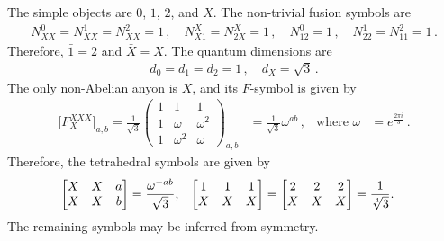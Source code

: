 The simple objects are $0$, $1$, $2$, and $X$.
The non-trivial fusion symbols are
\begin{align}
	N^0_{XX} = N^1_{XX} = N^2_{XX} = 1 \,,
	\quad	N^X_{X1} = N^X_{2X} = 1 \,,
	\quad	N^0_{12} = 1 \,,
	\quad	N^1_{22} = N^2_{11} = 1 \,.
\end{align}
Therefore, $\bar{1} = 2$ and $\bar{X} = X$.
The quantum dimensions are
\begin{align}
	d_0 = d_1 = d_2 = 1 \,,
	\quad	d_X = \sqrt{3} \,.
\end{align}
The only non-Abelian anyon is $X$, and its $F$-symbol is given by
\begin{align}
	\big[ F_X^{XXX} \big]_{a,b} = \frac{1}{\sqrt{3}}
			\begin{pmatrix} 1 & 1 & 1 \\ 1 & \omega & \omega^2 \\ 1 & \omega^2 & \omega \end{pmatrix}_{a,b}
		&=	\frac{1}{\sqrt{3}} \omega^{ab} \,,
	&	\text{where } \omega &= e^{\frac{2\pi i}{3}} \,.
\end{align}
Therefore, the tetrahedral symbols are given by
\begin{align}
	\begin{bmatrix} X & X & a \\ X & X & b \end{bmatrix} &= \frac{\omega^{-ab}}{\sqrt{3}} ,
&	\begin{bmatrix} 1 & 1 & 1 \\ X & X & X \end{bmatrix} &= \begin{bmatrix} 2 & 2 & 2 \\ X & X & X \end{bmatrix} = \frac{1}{\sqrt[4]{3}} .
\end{align}
The remaining symbols may be inferred from symmetry.





